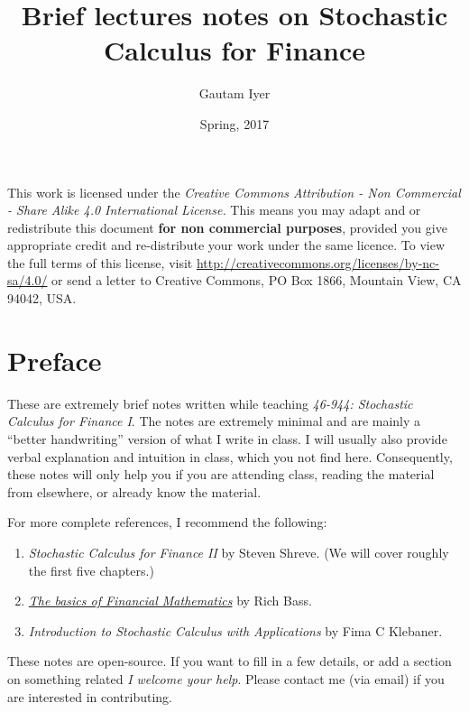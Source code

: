 
\frontmatter
\title{Brief lectures notes on Stochastic Calculus for Finance}
\author{Gautam Iyer}
\date{Spring, 2017}
\hypersetup{pageanchor=false}
\maketitle%

This work is licensed under the \emph{Creative Commons Attribution - Non Commercial - Share Alike 4.0 International License.}
This means you may adapt and or redistribute this document \textbf{for non commercial purposes}, provided you give appropriate credit and re-distribute your work under the same licence.
To view the full terms of this license, visit \url{http://creativecommons.org/licenses/by-nc-sa/4.0/} or send a letter to Creative Commons, PO Box 1866, Mountain View, CA 94042, USA.
\maketitle

\chapter*{Preface}

These are extremely brief notes written while teaching \emph{46-944: Stochastic Calculus for Finance I}.
The notes are extremely minimal and are mainly a ``better handwriting'' version of what I write in class.
I will usually also provide verbal explanation and intuition in class, which you  not find here.
Consequently, these notes will only help you if you are attending class, reading the material from elsewhere, or already know the material.

For more complete references, I recommend the following:
\begin{enumerate}
  \item
    \emph{Stochastic Calculus for Finance II} by Steven Shreve.
    (We will cover roughly the first five chapters.)
  \item 
    \emph{\href{http://bass.math.uconn.edu/finlmath.pdf}{The basics of Financial Mathematics}} by Rich Bass.
  \item
    \emph{Introduction to Stochastic Calculus with Applications} by Fima C Klebaner.
\end{enumerate}

\bigskip

\begin{note}[Contributing]
  These notes are open-source.
  If you want to fill in a few details, or add a section on something related \emph{I welcome your help}.
  Please contact me (via email) if you are interested in contributing.
\end{note}

\mainmatter
\hypersetup{pageanchor=true}

